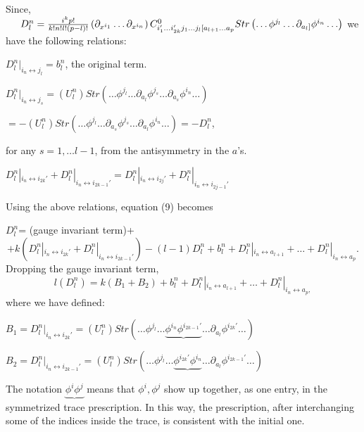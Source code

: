 \documentclass[a4paper,12pt]{article}
\begin{document}
Since,\newline
$\hspace*{.5cm}D^n_l=\frac{i^kp!}{k!n!l!(p-l)!}\left(\partial_{x^{i_1}}\ldots \partial_{x^{i_n}}\right) C^0_{i_1'\ldots i_{2k}'j_1\ldots j_l[a_{l+1}\ldots a_p} Str\left(\ldots \phi^{j_l}\ldots \partial_{a_l]}\phi^{i_n}\ldots \right)$ \newline
we have the following relations:

$D^n_l|_{i_n\leftrightarrow j_l} = b^n_l$,\newline
the original term. 

$D^n_l|_{i_n\leftrightarrow j_s}=(U^n_l)Str\left(\ldots \phi^{j_l}\ldots \partial_{a_l}\phi^{j_s}\ldots \partial_{a_s}\phi^{i_n}\ldots \right)$
\begin{center}
$=-(U^n_l)Str\left(\ldots \phi^{j_l}\ldots \partial_{a_s}\phi^{j_s}\ldots \partial_{a_l}\phi^{i_n}\ldots \right)= -D^n_l$,
\end{center}
 for any $s=1,\ldots l-1$, from the antisymmetry in the $a$'s.

$D^n_l|_{i_n\leftrightarrow i_{2k}' }+D^n_l|_{i_n\leftrightarrow i_{2k-1}'}=D^n_l|_{i_n\leftrightarrow i_{2j}'}+D^n_l|_{i_n\leftrightarrow i_{2j-1}'}$

Using the above relations, equation (9) becomes

$D^n_l$= (gauge  invariant term)+
\begin{equation}
+k(D^n_l|_{i_n\leftrightarrow i_{2k}'}+D^n_l|_{i_n\leftrightarrow i_{2k-1}'})-(l-1)D^n_l+b^n_l+D^n_l|_{i_n\leftrightarrow a_{l+1}}+\ldots +D^n_l|_{i_n\leftrightarrow a_p}.
\end{equation}
 Dropping the gauge invariant term, 
\begin{equation}       
  l(D^n_l)=k(B_1+B_2)+b^n_l+ D^n_l|_{i_n\leftrightarrow a_{l+1}}+\ldots +D^n_l|_{i_n\leftrightarrow a_p,}
\end{equation} where we have defined:
\begin{center}
$B_1=D^n_l|_{i_n\leftrightarrow i_{2k}'}=(U^n_l)Str\left(\ldots \phi^{j_l}\ldots \underbrace{\phi^{i_n}\phi^{i_{2k-1}'}}\ldots \partial_{a_l}\phi^{i_{2k}'}\ldots \right)$

$B_2=D^n_l|_{i_n\leftrightarrow i_{2k-1}'}=(U^n_l)Str\left(\ldots \phi^{j_l}\ldots \underbrace{\phi^{i_{2k}'}\phi^{i_n}}\ldots \partial_{a_l}\phi^{i_{2k-1}'}\ldots \right)$
\end{center}
The notation $\underbrace{\phi^i\phi^j}$ means that $\phi^i,\phi^j$ show up together, as one entry, in the symmetrized trace prescription. In this way, the prescription, after interchanging some of the indices inside the trace, is consistent with the initial one.  
\end{document}
